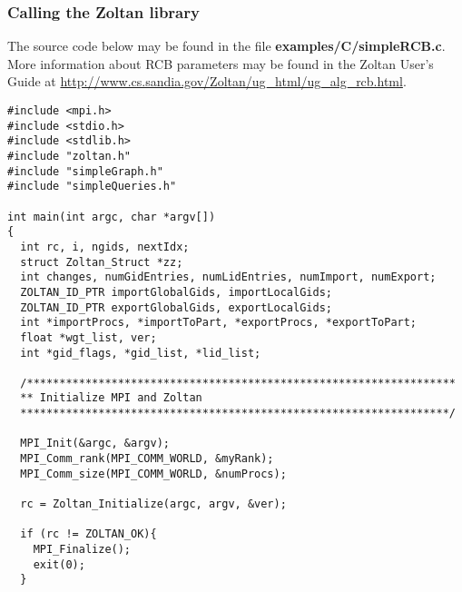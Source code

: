 \clearpage
\subsubsection{Calling the Zoltan library}

The source code below may be found in the file
\textbf{examples/C/simpleRCB.c}.
More information about RCB parameters
may be found in the Zoltan User's Guide at
\url{http://www.cs.sandia.gov/Zoltan/ug_html/ug_alg_rcb.html}.

\begin{flushleft}
\begin{verbatim}
#include <mpi.h>
#include <stdio.h>
#include <stdlib.h>
#include "zoltan.h"
#include "simpleGraph.h"
#include "simpleQueries.h"

int main(int argc, char *argv[])
{
  int rc, i, ngids, nextIdx;
  struct Zoltan_Struct *zz;
  int changes, numGidEntries, numLidEntries, numImport, numExport;
  ZOLTAN_ID_PTR importGlobalGids, importLocalGids;
  ZOLTAN_ID_PTR exportGlobalGids, exportLocalGids; 
  int *importProcs, *importToPart, *exportProcs, *exportToPart;
  float *wgt_list, ver;
  int *gid_flags, *gid_list, *lid_list;

  /******************************************************************
  ** Initialize MPI and Zoltan
  ******************************************************************/

  MPI_Init(&argc, &argv);
  MPI_Comm_rank(MPI_COMM_WORLD, &myRank);
  MPI_Comm_size(MPI_COMM_WORLD, &numProcs);

  rc = Zoltan_Initialize(argc, argv, &ver);

  if (rc != ZOLTAN_OK){
    MPI_Finalize();
    exit(0);
  }
\end{verbatim}
\end{flushleft}

